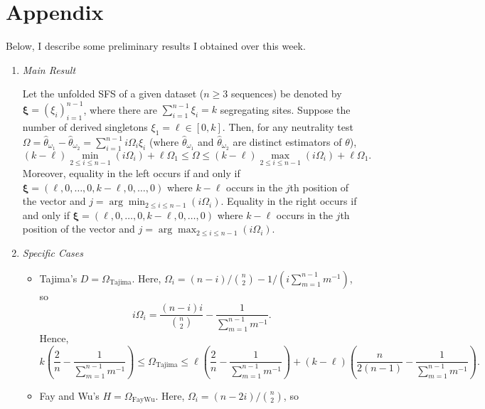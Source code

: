 \documentclass[lettersize, 10.5pt]{article}
\begin{document}
\newpage
\section*{Appendix}
Below, I describe some preliminary results I obtained over this week.
\begin{enumerate}
\item \textit{Main Result}

Let the unfolded SFS of a given dataset ($n\geqslant 3$ sequences) be denoted by $\boldsymbol{\xi}=(\xi_i)_{i=1}^{n-1}$, where there are $\sum_{i=1}^{n-1}\xi_i=k$ segregating sites. Suppose the number of derived singletons $\xi_1= \ell\in[0,k]$. Then, for any neutrality test $\Omega=\hat{\theta}_{\omega_1}-\hat{\theta}_{\omega_2}=\sum_{i=1}^{n-1}i\Omega_i\xi_i$ (where $\hat{\theta}_{\omega_1}$ and $\hat{\theta}_{\omega_2}$ are distinct estimators of $\theta$), 
\begin{equation*}
(k-\ell) \min_{2\leqslant i\leqslant n-1}(i\Omega_i) + \ell\Omega_1 \leqslant \Omega \leqslant (k-\ell) \max_{2\leqslant i\leqslant n-1}(i\Omega_i) + \ell\Omega_1. 
\end{equation*}
Moreover, equality in the left occurs if and only if $\boldsymbol{\xi}=(\ell,0,\ldots,0, k-\ell,0,\ldots,0)$ where $k-\ell$ occurs in the $j$th position of the vector and $j=\arg\min_{2\leqslant i\leqslant n-1}(i\Omega_i)$. Equality in the right occurs if and only if $\boldsymbol{\xi}=(\ell,0,\ldots,0, k-\ell,0,\ldots,0)$ where $k-\ell$ occurs in the $j$th position of the vector and $j=\arg\max_{2\leqslant i\leqslant n-1}(i\Omega_i)$.
\item \textit{Specific Cases}
\begin{itemize}
\item Tajima's $D=\Omega_\text{Tajima}$. Here, $\Omega_i=(n-i)\big/{n\choose 2} - 1\big/(i\sum_{m=1}^{n-1} m^{-1})$, so 
\begin{equation*}
i\Omega_i = \frac{(n-i)i}{{n\choose 2}} - \frac{1}{\sum_{m=1}^{n-1} m^{-1}}.
\end{equation*}
Hence, 
\begin{equation*}
k\left(\frac{2}{n}-\frac{1}{\sum_{m=1}^{n-1} m^{-1}}\right) \leqslant \Omega_\text{Tajima} \leqslant \ell\left(\frac{2}{n} - \frac{1}{\sum_{m=1}^{n-1} m^{-1}}\right) + (k-\ell)\left(\frac{n}{2(n-1)} - \frac{1}{\sum_{m=1}^{n-1} m^{-1}}\right).
\end{equation*}
\item Fay and Wu's $H=\Omega_\text{FayWu}$. Here, $\Omega_i=(n-2i)\big/{n\choose 2}$, so 
\begin{equation*}

\end{equation*}
\end{itemize}
\end{enumerate}
\end{document}
